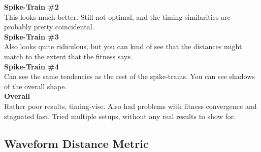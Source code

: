 \textbf{Spike-Train \#2} \\
This looks much better. Still not optimal, and the timing similarities are probably pretty coincidental. \\

\textbf{Spike-Train \#3} \\
Also looks quite ridiculous, but you can kind of see that the distances might match to the extent that the
fitness says.  \\

\textbf{Spike-Train \#4} \\
Can see the same tendencies as the rest of the spike-trains. You can see shadows of the overall shape.  \\

\textbf{Overall} \\
Rather poor results, timing-vise. Also had problems with fitness convergence and stagnated fast. Tried multiple
setups, without any real results to show for. 






\subsection{Waveform Distance Metric}

